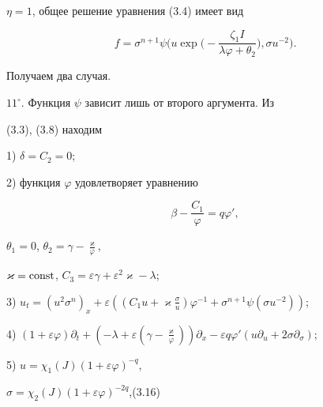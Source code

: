 $\eta=1$, общее решение уравнения (3.4) имеет вид 


$$ 


f=\sigma^{n+1}\psi\bigg(u\exp\bigg(-\frac{\zeta_1I} 


{\lambda\varphi+\theta_2}\bigg),\sigma u^{-2}\bigg). 


$$ 


 


Получаем два случая. 


 


\noindent{}$11^\circ$. Функция $\psi$ зависит лишь от второго аргумента. Из 


(3.3), (3.8) находим 


 


1) $\delta=C_2=0$; 


 


2) функция $\varphi$ удовлетворяет уравнению 


\begin{equation} 


\beta-\frac{C_1}{\varphi}=q\varphi', \tag{3.15} 


\end{equation} 


$\theta_1=0$, $\theta_2=\gamma-\frac{\varkappa}{\varphi}$, 


$\varkappa=\const$, $C_3=\varepsilon\gamma+\varepsilon^2 


\varkappa-\lambda$; 


 


3) $u_t=(u^2\sigma^n)_x+\varepsilon((C_1u+\varkappa\frac{\sigma}{u} 


)\varphi^{-1}+\sigma^{n+1}\psi(\sigma u^{-2}))$; 


 


4) $(1+\varepsilon\varphi)\partial_t+(-\lambda+\varepsilon 


(\gamma-\frac{\varkappa}{\varphi}))\partial_x-\varepsilon 


q\varphi'(u\partial_u+2\sigma\partial_\sigma)$; 


 


5) \hfill $u=\chi_1(J)(1+\varepsilon\varphi)^{-q}$,\quad 


$\sigma=\chi_2(J)(1+\varepsilon\varphi)^{-2q}$,\hfill (3.16) 



